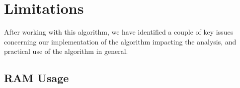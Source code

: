 \documentclass{article}
\newcommand{\figref}[1]{Figure \ref{#1}}
\begin{document}
% 
% 
% 



\section{Limitations} \label{sec:limitations}

After working with this algorithm, we have identified a couple of key issues concerning our implementation of the algorithm impacting the analysis, and practical use of the algorithm in general.

\subsection{RAM Usage}
\end{document}
